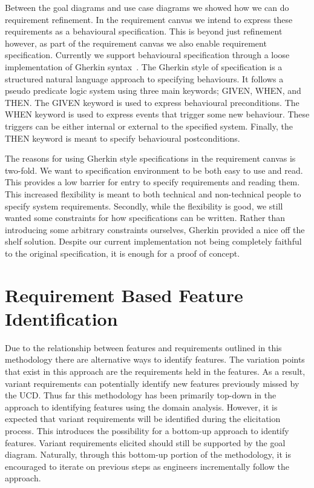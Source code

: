 Between the goal diagrams and use case diagrams we showed how we can do requirement refinement. In the requirement canvas we intend to express these requirements as a behavioural specification. This is beyond just refinement however, as part of the requirement canvas we also enable requirement specification. Currently we support behavioural specification through a loose implementation of Gherkin syntax~\cite{cucumberdocs}. The Gherkin style of specification is a structured natural language approach to specifying behaviours. It follows a pseudo predicate logic system using three main keywords; GIVEN, WHEN, and THEN. The GIVEN keyword is used to express behavioural preconditions. The WHEN keyword is used to express events that trigger some new behaviour. These triggers can be either internal or external to the specified system. Finally, the THEN keyword is meant to specify behavioural postconditions. 

The reasons for using Gherkin style specifications in the requirement canvas is two-fold. We want to specification environment to be both easy to use and read. This provides a low barrier for entry to specify requirements and reading them. This increased flexibility is meant to both technical and non-technical people to specify system requirements. Secondly, while the flexibility is good, we still wanted some constraints for how specifications can be written. Rather than introducing some arbitrary constraints ourselves, Gherkin provided a nice off the shelf solution. Despite our current implementation not being completely faithful to the original specification, it is enough for a proof of concept.

\section{Requirement Based Feature Identification}

Due to the relationship between features and requirements outlined in this methodology there are alternative ways to identify features. The variation points that exist in this approach are the requirements held in the features. As a result, variant requirements can potentially identify new features previously missed by the \ac{UCD}. Thus far this methodology has been primarily top-down in the approach to identifying features using the domain analysis. However, it is expected that variant requirements will be identified during the elicitation process. This introduces the possibility for a bottom-up approach to identify features. Variant requirements elicited should still be supported by the goal diagram. Naturally, through this bottom-up portion of the methodology, it is encouraged to iterate on previous steps as engineers incrementally follow the approach.

